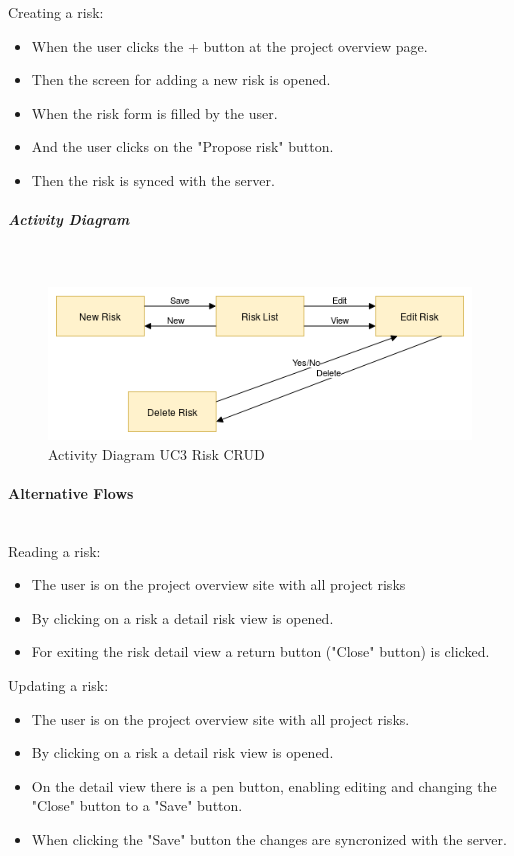 Creating a risk:
\begin{itemize}
	\setlength\itemsep{-1.5em}
	\item  When the user clicks the + button at the project overview page.
	\item Then the screen for adding a new risk is opened.
	\item When the risk form is filled by the user.
	\item And the user clicks on the "Propose risk" button.
	\item Then the risk is synced with the server.
\end{itemize}

\subparagraph{Activity Diagram}\mbox{}\\
\begin{figure}[h]
	\centering
	\includegraphics[width=1.0\textwidth]{Content/Domain/UC3RiskCRUDactivitydiagram.png}
	\caption{Activity Diagram \ac{UC}3 Risk CRUD}
	\label{fig:activityDiagramUC3}
\end{figure}

\paragraph*{Alternative Flows}\mbox{}\\

Reading a risk:  
\begin{itemize}
	\setlength\itemsep{-1.5em}
	\item The user is on the project overview site with all project risks
	\item By clicking on a risk a detail risk view is opened.
	\item For exiting the risk detail view a return button ("Close" button) is clicked.
\end{itemize}

Updating a risk: 
\begin{itemize}
	\setlength\itemsep{-1.5em}
	\item The user is on the project overview site with all project risks.
	\item By clicking on a risk a detail risk view is opened.
	\item On the detail view there is a pen button, enabling editing and changing the "Close" button to a "Save" button.
	\item When clicking the "Save" button the changes are syncronized with the server.
\end{itemize} 

